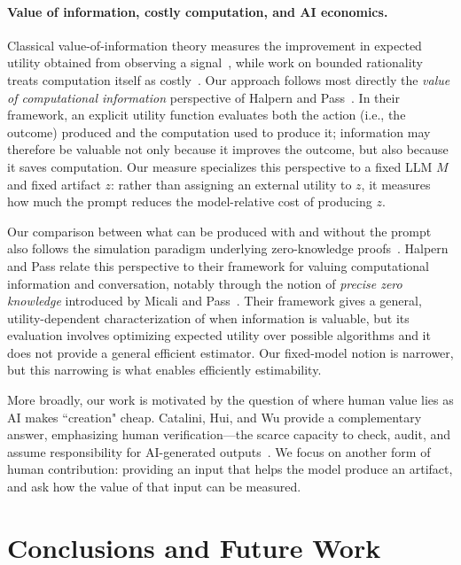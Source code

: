\documentclass[letterpaper]{article} %
\theoremstyle{definition}
\theoremstyle{remark}
\begin{document}
\paragraph{Value of information, costly computation, and AI economics.}
Classical value-of-information theory measures the improvement in expected
utility obtained from observing a signal~\cite{Howard66}, while work on bounded
rationality treats computation itself as costly~\cite{RW91}. Our approach
follows most directly the \emph{value of computational information} perspective
of Halpern and Pass~\cite{HP11,HP14}. In their framework, an explicit utility
function evaluates both the action (i.e., the outcome) produced and the computation
used to produce it; information may therefore be valuable not only because it
improves the outcome, but also because it saves computation. Our measure
specializes this perspective to a fixed LLM $M$ and fixed artifact $z$: rather than
assigning an external utility to \(z\), it measures how much the prompt reduces
the model-relative cost of producing \(z\).

Our comparison between what can be produced with and without the prompt also follows
the simulation paradigm underlying zero-knowledge proofs~\cite{GMR}. Halpern
and Pass relate this perspective to their framework for valuing computational
information and conversation, notably through the notion of \emph{precise zero
knowledge} introduced by Micali and Pass~\cite{MP06,HP11}. Their framework gives
a general, utility-dependent characterization of when information is valuable,
but its evaluation involves optimizing expected utility over possible
algorithms and it does not provide a general efficient estimator. Our
fixed-model notion is narrower, but this narrowing is what enables efficiently estimability.

More broadly, our work is motivated by the question of where human value lies
as AI makes ``creation" cheap. Catalini, Hui, and Wu provide a
complementary answer, emphasizing human verification---the scarce capacity to
check, audit, and assume responsibility for AI-generated outputs~\cite{CHW26}.
We focus on another form of human contribution: providing an input that helps
the model produce an artifact, and ask how the value of that input can be
measured.

\section{Conclusions and Future Work}\label{sec:conclusion}
\end{document}
